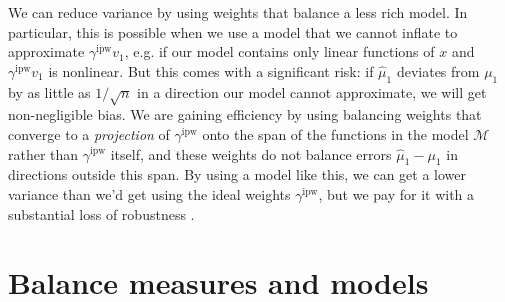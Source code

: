 \documentclass{article}
\theoremstyle{definition}
\newcommand{\ipw}{\text{ipw}}
\newcommand{\gammaipw}{\ensuremath{\gamma^{\ipw}}}
\newcommand{\model}{\mathcal{M}}
\newcommand{\<}{\langle}
\renewcommand{\>}{\rangle}
\newcommand\cmnt[2]{\;
{\textcolor{red}{[{\em #1 --- #2}] \;}
}}
\newcommand\avi[1]{\cmnt{#1}{Avi}}
\newcommand\dah[1]{\cmnt{#1}{Skip}}
\begin{document}
We can reduce variance by using weights that balance a less rich model. In particular, this is possible when we use a model that we cannot inflate to approximate $\gammaipw v_1$, e.g. if our model contains only linear functions of $x$ and $\gammaipw v_1$ is nonlinear. But this comes with a significant risk: if $\hat \mu_1$ deviates from $\mu_1$ by as little as $1/\sqrt{n}$ in a direction our model cannot approximate, we will get non-negligible bias. We are gaining efficiency by using balancing weights that converge to a \emph{projection} of $\gammaipw$ onto the span of the functions in the model $\model$ rather than $\gammaipw$ itself, and these weights do not balance errors $\hat \mu_1 - \mu_1$ in directions outside this span. By using a model like this, we can get a lower variance than we'd get using the ideal weights $\gammaipw$, but we pay for it with a substantial loss of robustness \citep[Remark 3]{hirshberg2021augmented}.



\section{Balance measures and models}
\label{sec:balance_models}


\end{document}
